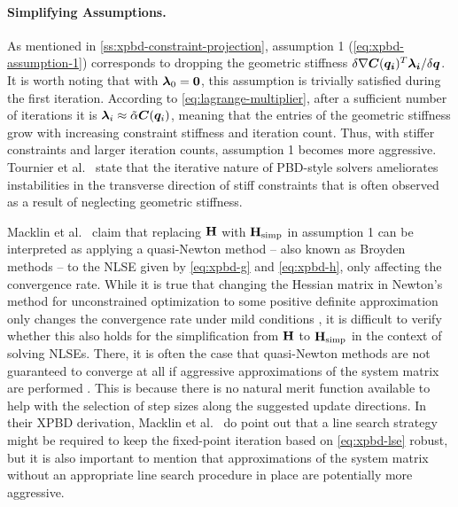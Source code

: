 \paragraph{Simplifying Assumptions.}
As mentioned in \cref{ss:xpbd-constraint-projection}, assumption 1 (\cref{eq:xpbd-assumption-1}) corresponds to dropping the geometric stiffness 
$\delta \nabla \bm{C}(\bm{q_i})^T \bm{\lambda_i} / \delta \bm{q}$. It is worth noting that with $\bm{\lambda}_0 = \bm{0}$, this assumption is 
trivially satisfied during the first iteration. According to \autoref{eq:lagrange-multiplier}, after a sufficient number of iterations it is $\bm{\lambda}_i 
\approx \tilde{\mathbf{\alpha}} \bm{C}(\bm{q}_i)$, meaning that the entries of the geometric stiffness grow with increasing constraint stiffness and iteration
count. Thus, with stiffer constraints and larger iteration counts, assumption 1 becomes more aggressive. Tournier et al.\ \cite{tournier2015} state that
the iterative nature of PBD-style solvers ameliorates instabilities in the transverse direction of stiff constraints that is often observed as a result
of neglecting geometric stiffness.

Macklin et al.\ \cite{macklin2016} claim that replacing $\mathbf{H}$ with $\mathbf{H}_{\text{simp}}$ in assumption 1 can be interpreted as applying a quasi-Newton 
method -- also known as Broyden methods -- to the NLSE given by \autoref{eq:xpbd-g} and \autoref{eq:xpbd-h}, only affecting the convergence rate. While it is 
true that changing the Hessian 
matrix in Newton's method for unconstrained optimization to some positive definite approximation only changes the convergence rate under mild conditions
\cite{nocedal2006}, it is difficult to verify whether this also holds for the simplification from $\mathbf{H}$ to $\mathbf{H}_{\text{simp}}$ in the context of
solving NLSEs. There, it is often the case that quasi-Newton methods are not guaranteed to converge at all if aggressive approximations
of the system matrix are performed \cite{nocedal2006}. This is because there is no natural merit function available to help with the selection of 
step sizes along the suggested update directions. In their XPBD derivation, Macklin et al.\ \cite{macklin2016} do
point out that a line search strategy might be required to keep the fixed-point iteration based on \autoref{eq:xpbd-lse} robust, but it is also important
to mention that approximations of the system matrix without an appropriate line search procedure in place are potentially more aggressive.

